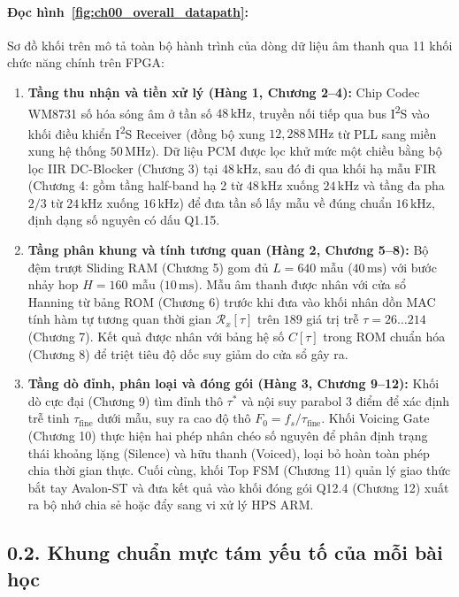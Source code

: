 \paragraph{Đọc hình~\ref{fig:ch00_overall_datapath}:}
Sơ đồ khối trên mô tả toàn bộ hành trình của dòng dữ liệu âm thanh qua 11 khối chức năng chính trên FPGA:
\begin{enumerate}[leftmargin=1.4em]
    \item \textbf{Tầng thu nhận và tiền xử lý (Hàng 1, Chương 2--4):} Chip Codec WM8731 số hóa sóng âm ở tần số $48\,\text{kHz}$, truyền nối tiếp qua bus I\textsuperscript{2}S vào khối điều khiển I\textsuperscript{2}S Receiver (đồng bộ xung $12{,}288\,\text{MHz}$ từ PLL sang miền xung hệ thống $50\,\text{MHz}$). Dữ liệu PCM được lọc khử mức một chiều bằng bộ lọc IIR DC-Blocker (Chương 3) tại $48\,\text{kHz}$, sau đó đi qua khối hạ mẫu FIR (Chương 4: gồm tầng half-band hạ 2 từ $48\,\text{kHz}$ xuống $24\,\text{kHz}$ và tầng đa pha $2/3$ từ $24\,\text{kHz}$ xuống $16\,\text{kHz}$) để đưa tần số lấy mẫu về đúng chuẩn $16\,\text{kHz}$, định dạng số nguyên có dấu Q1.15.
    \item \textbf{Tầng phân khung và tính tương quan (Hàng 2, Chương 5--8):} Bộ đệm trượt Sliding RAM (Chương 5) gom đủ $L = 640$ mẫu ($40\,\text{ms}$) với bước nhảy hop $H = 160$ mẫu ($10\,\text{ms}$). Mẫu âm thanh được nhân với cửa sổ Hanning từ bảng ROM (Chương 6) trước khi đưa vào khối nhân dồn MAC tính hàm tự tương quan thời gian $\mathcal{R}_x[\tau]$ trên $189$ giá trị trễ $\tau = 26 \ldots 214$ (Chương 7). Kết quả được nhân với bảng hệ số $C[\tau]$ trong ROM chuẩn hóa (Chương 8) để triệt tiêu độ dốc suy giảm do cửa sổ gây ra.
    \item \textbf{Tầng dò đỉnh, phân loại và đóng gói (Hàng 3, Chương 9--12):} Khối dò cực đại (Chương 9) tìm đỉnh thô $\tau^*$ và nội suy parabol 3 điểm để xác định trễ tinh $\tau_{\mathrm{fine}}$ dưới mẫu, suy ra cao độ thô $F_0 = f_s / \tau_{\mathrm{fine}}$. Khối Voicing Gate (Chương 10) thực hiện hai phép nhân chéo số nguyên để phân định trạng thái khoảng lặng (Silence) và hữu thanh (Voiced), loại bỏ hoàn toàn phép chia thời gian thực. Cuối cùng, khối Top FSM (Chương 11) quản lý giao thức bắt tay Avalon-ST và đưa kết quả vào khối đóng gói Q12.4 (Chương 12) xuất ra bộ nhớ chia sẻ hoặc đẩy sang vi xử lý HPS ARM.
\end{enumerate}

\subsection*{0.2. Khung chuẩn mực tám yếu tố của mỗi bài học}

